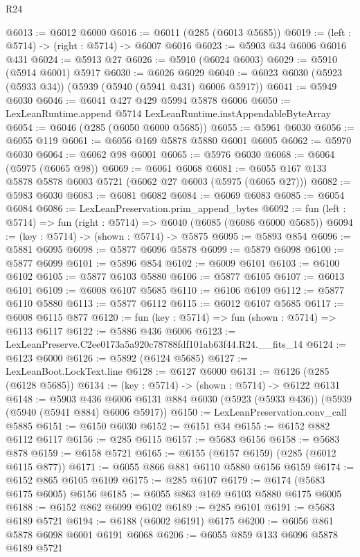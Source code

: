 \begin{lexlean}{R24}
\begin{coremodule}
@6013 := @6012 @6000
@6016 := @6011 (@285 (@6013 @5685))
@6019 := (left : @5714) -> (right : @5714) -> @6007 @6016
@6023 := @5903 @34 @6006 @6016 @431
@6024 := @5913 @27
@6026 := @5910 (@6024 @6003)
@6029 := @5910 (@5914 @6001) @5917
@6030 := @6026 @6029
@6040 := @6023 @6030 (@5923 (@5933 @34)) (@5939 (@5940 (@5941 @431) @6006 @5917))
@6041 := @5949 @6030
@6046 := @6041 @427 @429 @5994 @5878 @6006
@6050 := LexLeanRuntime.append @5714 LexLeanRuntime.instAppendableByteArray
@6054 := @6046 (@285 (@6050 @6000 @5685))
@6055 := @5961 @6030
@6056 := @6055 @119
@6061 := @6056 @169 @5878 @5880 @6001 @6005
@6062 := @5970 @6030
@6064 := @6062 @98 @6001
@6065 := @5976 @6030
@6068 := @6064 (@5975 (@6065 @98))
@6069 := @6061 @6068
@6081 := @6055 @167 @133 @5878 @5878 @6003 @5721 (@6062 @27 @6003 (@5975 (@6065 @27)))
@6082 := @5983 @6030
@6083 := @6081 @6082
@6084 := @6069 @6083
@6085 := @6054 @6084
@6086 := LexLeanPreservation.prim_append_bytes
@6092 := fun (left : @5714) => fun (right : @5714) => @6040 (@6085 (@6086 @6000 @5685))
@6094 := (key : @5714) -> (shown : @5714) -> @5875
@6095 := @5893 @854
@6096 := @5881 @6095
@6098 := @5877 @6096 @5878
@6099 := @5879 @6098
@6100 := @5877 @6099
@6101 := @5896 @854
@6102 := @6009 @6101
@6103 := @6100 @6102
@6105 := @5877 @6103 @5880
@6106 := @5877 @6105
@6107 := @6013 @6101
@6109 := @6008 @6107 @5685
@6110 := @6106 @6109
@6112 := @5877 @6110 @5880
@6113 := @5877 @6112
@6115 := @6012 @6107 @5685
@6117 := @6008 @6115 @877
@6120 := fun (key : @5714) => fun (shown : @5714) => @6113 @6117
@6122 := @5886 @436 @6006
@6123 := LexLeanPreserve.C2ee0173a5a920c78788fdf101ab63f44.R24.__fits_14
@6124 := @6123 @6000
@6126 := @5892 (@6124 @5685)
@6127 := LexLeanBoot.LockText.line
@6128 := @6127 @6000
@6131 := @6126 (@285 (@6128 @5685))
@6134 := (key : @5714) -> (shown : @5714) -> @6122 @6131
@6148 := @5903
    @436
    @6006
    @6131
    @884
    @6030
    (@5923 (@5933 @436))
    (@5939 (@5940 (@5941 @884) @6006 @5917))
@6150 := LexLeanPreservation.conv_call @5885
@6151 := @6150 @6030
@6152 := @6151 @34
@6155 := @6152 @882 @6112 @6117
@6156 := @285 @6115
@6157 := @5683 @6156
@6158 := @5683 @878
@6159 := @6158 @5721
@6165 := @6155 (@6157 @6159) (@285 (@6012 @6115 @877))
@6171 := @6055 @866 @881 @6110 @5880 @6156 @6159
@6174 := @6152 @865 @6105 @6109
@6175 := @285 @6107
@6179 := @6174 (@5683 @6175 @6005) @6156
@6185 := @6055 @863 @169 @6103 @5880 @6175 @6005
@6188 := @6152 @862 @6099 @6102
@6189 := @285 @6101
@6191 := @5683 @6189 @5721
@6194 := @6188 (@6002 @6191) @6175
@6200 := @6056 @861 @5878 @6098 @6001 @6191 @6068
@6206 := @6055 @859 @133 @6096 @5878 @6189 @5721

\end{coremodule}
\end{lexlean}
